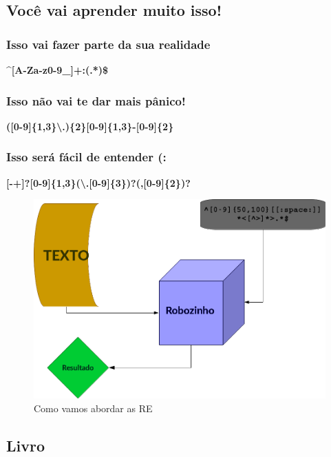 \subsection{Você vai aprender muito isso!}
\begin{frame}
\frametitle{Isso vai fazer parte da sua realidade}
\centering
\bf
\Large{\textasciicircum *[A-Za-z0-9\_]+:(.*)\$}
\end{frame}
\begin{frame}
\frametitle{Isso não vai te dar mais pânico!}
\centering
\bf
\Large{([0-9]\{1,3\}\textbackslash.)\{2\}[0-9]\{1,3\}-[0-9]\{2\}}
\end{frame}
\begin{frame}
\frametitle{Isso será fácil de entender (:}
\centering
\bf
\Large{[-+]?[0-9]\{1,3\}(\textbackslash.[0-9]\{3\})?(,[0-9]\{2\})?}
\end{frame}
\begin{frame}
\begin{figure}
\includegraphics[height=0.75\textheight]{./imagens/re/como-vai-funcionar.png}
\caption{Como vamos abordar as RE}
\end{figure}
\end{frame}

\subsection{Livro}

